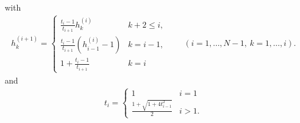 \documentclass[12pt]{article}
\numberwithin{equation}{section}
\theoremstyle{definition}
\theoremstyle{remark}
\begin{document}
with
\begin{align}
    h^{(i+1)}_k = \begin{cases}
        \frac{t_{i}-1}{t_{i+1}}h^{(i)}_k    & k+2\leq i, \\
        \frac{t_{i}-1}{t_{i+1}}(h^{(i)}_{i-1}-1)    & k = i-1, \\
        1+\frac{t_{i}-1}{t_{i+1}}   & k = i
    \end{cases} \qquad (i=1,\dots,N-1, \ k=1,\dots,i). \label{E:nesterovsteps}
\end{align}
and
\begin{align*}
    t_i =
        \begin{cases}
            1       & i=1 \\
            \frac{1+\sqrt{1+4 t_{i-1}^2}}{2} & i>1.
        \end{cases}
\end{align*}
\end{document}
